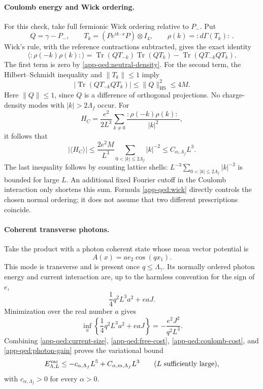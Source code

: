 \paragraph{Coulomb energy and Wick ordering.}
For this check, take full fermionic Wick ordering relative to \(P_-\). Put
\[
 Q=\gamma-P_-,\qquad
 T_k=(Pe^{ik\cdot x}P)\otimes I_4,
 \qquad \rho(k)=:\!d\Gamma(T_k)\!:\,.
\]
Wick's rule, with the reference contractions subtracted, gives the exact identity
\begin{equation}
 \langle:\!\rho(-k)\rho(k)\!:\rangle
 =\operatorname{Tr}(QT_{-k})\operatorname{Tr}(QT_k)
  -\operatorname{Tr}(QT_{-k}QT_k).
 \label{app-qed:wick}
\end{equation}
The first term is zero by \eqref{app-qed:neutral-density}. For the second term, the Hilbert--Schmidt inequality and \(\|T_k\|\leq1\) imply
\[
 \left|\operatorname{Tr}(QT_{-k}QT_k)\right|
 \leq\|Q\|_{\mathrm{HS}}^2\leq4M.
\]
Here \(\|Q\|\leq1\), since \(Q\) is a difference of orthogonal projections. No charge-density modes with \(|k|>2\Lambda_f\) occur. For
\[
 H_C=\frac{e^2}{2L^3}
       \sum_{k\ne0}\frac{:\!\rho(-k)\rho(k)\!:\,}{|k|^2},
\]
it follows that
\begin{equation}
 |\langle H_C\rangle|
 \leq\frac{2e^2M}{L^3}
          \sum_{0<|k|\leq2\Lambda_f}|k|^{-2}
 \leq C_{\alpha,\Lambda_f}L^3.
 \label{app-qed:coulomb-cost}
\end{equation}
The last inequality follows by counting lattice shells:
\(L^{-3}\sum_{0<|k|\leq2\Lambda_f}|k|^{-2}\) is bounded for large \(L\). An additional fixed Fourier cutoff in the Coulomb interaction only shortens this sum. Formula \eqref{app-qed:wick} directly controls the chosen normal ordering; it does not assume that two different prescriptions coincide.

\paragraph{Coherent transverse photons.}
Take the product with a photon coherent state whose mean vector potential is
\[
 A(x)=a e_2\cos(qx_1).
\]
This mode is transverse and is present once \(q\leq\Lambda_\gamma\). Its normally ordered photon energy and current interaction are, up to the harmless convention for the sign of \(e\),
\[
 \frac14 q^2L^3 a^2+eaJ.
\]
Minimization over the real number \(a\) gives
\begin{equation}
 \inf_a\left\{\frac14q^2L^3a^2+eaJ\right\}
 =-\frac{e^2J^2}{q^2L^3}.
 \label{app-qed:photon-gain}
\end{equation}
Combining \eqref{app-qed:current-size}, \eqref{app-qed:free-cost},
\eqref{app-qed:coulomb-cost}, and \eqref{app-qed:photon-gain} proves the variational bound
\begin{equation}
 E^{\mathrm{vac}}_{\Lambda,L}
 \leq-c_{\alpha,\Lambda_f}L^5
      +C_{\alpha,m,\Lambda_f}L^3
 \qquad (L\hbox{ sufficiently large}),
 \label{app-qed:superextensive}
\end{equation}
with \(c_{\alpha,\Lambda_f}>0\) for every \(\alpha>0\).

